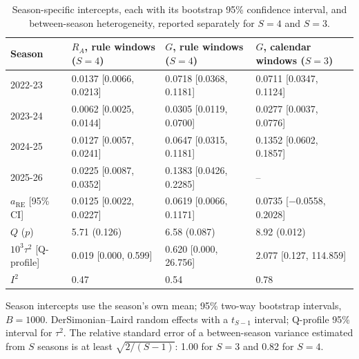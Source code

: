 \begin{table}[htbp]
\centering
\footnotesize
\caption{Season-specific intercepts, each with its bootstrap 95\% confidence interval, and between-season heterogeneity, reported separately for $S=4$ and $S=3$.}
\label{tab:s5}
\begin{tabular}{llll}
\toprule
Season & $R_A$, rule windows ($S=4$) & $G$, rule windows ($S=4$) & $G$, calendar windows ($S=3$) \\
\midrule
2022-23 & 0.0137 [0.0066, 0.0213] & 0.0718 [0.0368, 0.1181] & 0.0711 [0.0347, 0.1124] \\
2023-24 & 0.0062 [0.0025, 0.0144] & 0.0305 [0.0119, 0.0700] & 0.0277 [0.0037, 0.0776] \\
2024-25 & 0.0127 [0.0057, 0.0241] & 0.0647 [0.0315, 0.1181] & 0.1352 [0.0602, 0.1857] \\
2025-26 & 0.0225 [0.0087, 0.0352] & 0.1383 [0.0426, 0.2285] & -- \\
$a_{\mathrm{RE}}$ [95\% CI] & 0.0125 [0.0022, 0.0227] & 0.0619 [0.0066, 0.1171] & 0.0735 [$-$0.0558, 0.2028] \\
$Q$ ($p$) & 5.71 (0.126) & 6.58 (0.087) & 8.92 (0.012) \\
$10^3\tau^2$ [Q-profile] & 0.019 [0.000, 0.599] & 0.620 [0.000, 26.756] & 2.077 [0.127, 114.859] \\
$I^2$ & 0.47 & 0.54 & 0.78 \\
\bottomrule
\end{tabular}
\par\smallskip
\begin{minipage}{0.95\linewidth}\scriptsize Season intercepts use the season's own mean; 95\% two-way bootstrap intervals, $B=1000$. DerSimonian--Laird random effects with a $t_{S-1}$ interval; Q-profile 95\% interval for $\tau^2$. The relative standard error of a between-season variance estimated from $S$ seasons is at least $\sqrt{2/(S-1)}$: 1.00 for $S=3$ and 0.82 for $S=4$.\end{minipage}
\end{table}
